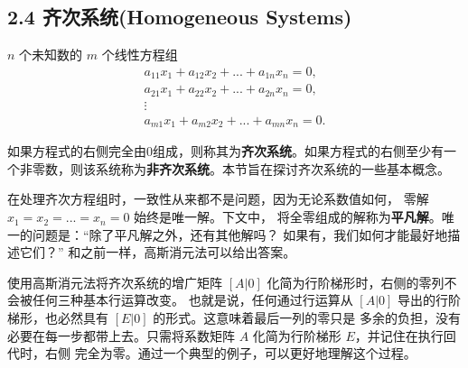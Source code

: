 \subsection*{2.4 齐次系统(Homogeneous Systems)}

\(n\) 个未知数的 \(m\) 个线性方程组
\[
\begin{array}{cols}
    a_{11}x_1 + a_{12}x_2 + ... + a_{1n}x_n = 0, \\
    a_{21}x_1 + a_{22}x_2 + ... + a_{2n}x_n = 0, \\
    \vdots \\
    a_{m1}x_1 + a_{m2}x_2 + ... + a_{mn}x_n = 0.
\end{array}
\]

如果方程式的右侧完全由0组成，则称其为\textbf{齐次系统}。如果方程式的右侧至少有一个非零数，则该系统称为\textbf{非齐次系统}。本节旨在探讨齐次系统的一些基本概念。

在处理齐次方程组时，一致性从来都不是问题，因为无论系数值如何，
零解 \(x_1 = x_2 = ... = x_n = 0\) 始终是唯一解。下文中，
将全零组成的解称为\textbf{平凡解}。唯一的问题是：“除了平凡解之外，还有其他解吗？
如果有，我们如何才能最好地描述它们？” 和之前一样，高斯消元法可以给出答案。

使用高斯消元法将齐次系统的增广矩阵 \([A|0]\) 化简为行阶梯形时，右侧的零列不会被任何三种基本行运算改变。
也就是说，任何通过行运算从 \([A|0]\) 导出的行阶梯形，也必然具有 \([E|0]\) 的形式。这意味着最后一列的零只是
多余的负担，没有必要在每一步都带上去。只需将系数矩阵 \(A\) 化简为行阶梯形 \(E\)，并记住在执行回代时，右侧
完全为零。通过一个典型的例子，可以更好地理解这个过程。

